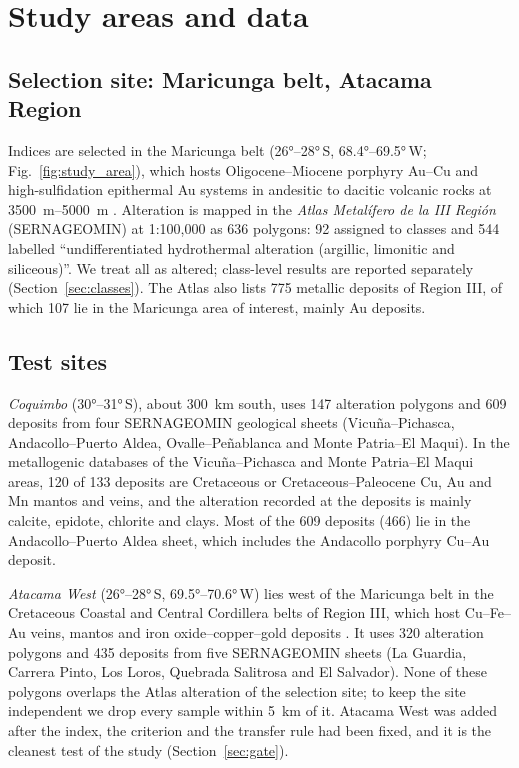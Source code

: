 \documentclass[pdflatex,sn-basic]{sn-jnl}
\begin{document}
\section{Study areas and data}
\label{sec:data}

\subsection{Selection site: Maricunga belt, Atacama Region}

Indices are selected in the Maricunga belt (\ang{26}--\ang{28}\,S, \ang{68.4}--\ang{69.5}\,W; Fig.~\ref{fig:study_area}), which hosts Oligocene--Miocene porphyry Au--Cu and high-sulfidation epithermal Au systems in andesitic to dacitic volcanic rocks at \SIrange{3500}{5000}{\meter} \citep{Sillitoe1991,Vila1991}. Alteration is mapped in the \emph{Atlas Metal\'ifero de la III Regi\'on} (SERNAGEOMIN) at 1:100{,}000 as 636 polygons: 92 assigned to classes and 544 labelled ``undifferentiated hydrothermal alteration (argillic, limonitic and siliceous)''. We treat all as altered; class-level results are reported separately (Section~\ref{sec:classes}). The Atlas also lists 775 metallic deposits of Region III, of which 107 lie in the Maricunga area of interest, mainly Au deposits.

\subsection{Test sites}

\emph{Coquimbo} (\ang{30}--\ang{31}\,S), about \SI{300}{\kilo\meter} south, uses 147 alteration polygons and 609 deposits from four SERNAGEOMIN geological sheets (Vicu\~na--Pichasca, Andacollo--Puerto Aldea, Ovalle--Pe\~nablanca and Monte Patria--El Maqui). In the metallogenic databases of the Vicu\~na--Pichasca and Monte Patria--El Maqui areas, 120 of 133 deposits are Cretaceous or Cretaceous--Paleocene Cu, Au and Mn mantos and veins, and the alteration recorded at the deposits is mainly calcite, epidote, chlorite and clays. Most of the 609 deposits (466) lie in the Andacollo--Puerto Aldea sheet, which includes the Andacollo porphyry Cu--Au deposit.

\emph{Atacama West} (\ang{26}--\ang{28}\,S, \ang{69.5}--\ang{70.6}\,W) lies west of the Maricunga belt in the Cretaceous Coastal and Central Cordillera belts of Region III, which host Cu--Fe--Au veins, mantos and iron oxide--copper--gold deposits \citep{Sillitoe2003}. It uses 320 alteration polygons and 435 deposits from five SERNAGEOMIN sheets (La Guardia, Carrera Pinto, Los Loros, Quebrada Salitrosa and El Salvador). None of these polygons overlaps the Atlas alteration of the selection site; to keep the site independent we drop every sample within \SI{5}{\kilo\meter} of it. Atacama West was added after the index, the criterion and the transfer rule had been fixed, and it is the cleanest test of the study (Section~\ref{sec:gate}).
\end{document}
